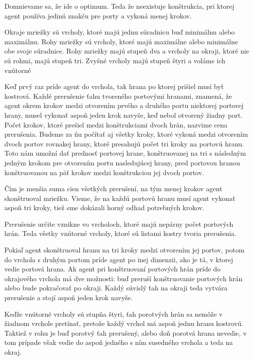Domnievame sa, že ide o optimum. Teda že neexistuje konštrukcia, pri ktorej
agent používa jedinú znakču pre porty a vykoná menej krokov. 



\begin{ozn}
Okraje mriežky sú vrcholy, ktoré majú jednu súradnicu buď minimálnu alebo
maximálnu. Rohy mriežky sú vrcholy, ktoré majú maximálne alebo minimálne obe
svoje súradnice.
Rohy mriežky majú stupeň dva a vrcholy na okraji, ktoré nie sú rohmi, majú
stupeň tri.
Zvyšné vrcholy majú stupeň štyri a voláme ich vnútorné
\end{ozn}

Keď prvý raz príde agent do vrchola, tak hrana po ktorej prišiel musí byť
kostrová.
Každé prerušenie ťahu tvoreného portovými hranami, znamená, že agent okrem
krokov medzi otvorením prvého a druhého portu niektorej portovej hrany,
musel vykonať aspoň jeden krok navyše, keď nebol otvorený žiadny port. 
Počet krokov, ktoré prešiel medzi konštrukciami dvoch hrán, nazvime 
cena prerušenia. Budeme za ňu počítať aj všetky kroky, ktoré vykoná medzi
otvorením dvoch portov rovnakej hrany, ktoré presahujú počet tri kroky na
portovú hranu. Toto nám umožní dať prednosť portovej hrane, konštruovanej na
tri s následným jedným krokom pre otvorením portu nasledujúcej hrany, pred
portovou hranou konštruovanou na päť krokov medzi konštrukciou jej dvoch
portov.

Čím je menšia suma cien všetkých prerušení, na tým menej krokov agent
skonštruoval mriežku.
Vieme, že na každú portovú hranu musí agent vykonať aspoň tri kroky, tiež
sme dokázali horný odhad potrebných krokov.

Prerušenie určite vznikne vo vrcholoch, ktoré majú nepárny počet portových
hrán. Teda všetky vnútorné vrcholy, ktoré sú listami kostry tvoria
prerušenia.

Pokiaľ agent skonštruoval hranu na tri kroky medzi otvorením jej portov,
potom do vrchola s druhým portom príde agent po inej dimenzii, ako je tá,
v ktorej vedie portová hrana. Ak agent pri konštruovaní portových hrán príde
do okrajového vrchola má dve možnosti: buď preruší konštruovanie portových
hrán alebo bude pokračovať po okraji. Každý súvislý ťah na okraji teda
vytvára prerušenie a stojí aspoň jeden krok navyše.

Keďže vnútorné vrcholy sú stupňa štyri, ťah porotvých hrán sa nemôže v
žiadnom vrchole pretínať, pretože každý vrchol má aspoň jednu hranu kostrovú.
Taktiež v rohu je buď porotvý ťah prerušený, alebo doň porotvá hrana
nevedie, v tom prípade však vedie do aspoň jedného s ním susedného vrchola a
teda na okraj.

